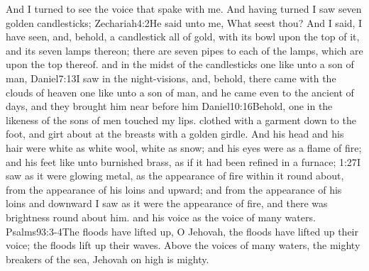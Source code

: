 And I turned to see the voice that spake with me. And having turned I saw seven golden candlesticks;%
	{Zechariah}{4:2}{He said unto me, What seest thou? And I said, I have seen, and, behold, a candlestick all of gold, with its bowl upon the top of it, and its seven lamps thereon; there are seven pipes to each of the lamps, which are upon the top thereof.} %
and in the midst of the candlesticks one like unto a son of man,%
%
			{Daniel}{7:13}{I saw in the night-visions, and, behold, there came with the clouds of heaven one like unto a son of man, and he came even to the ancient of days, and they brought him near before him}%
			{Daniel}{10:16}{Behold, one in the likeness of the sons of men touched my lips.} %
clothed with a garment down to the foot, and girt about at the breasts with a golden girdle.%
And his head and his hair were white as white wool, white as snow;%
and his eyes were as a flame of fire;%
and his feet like unto burnished brass, as if it had been refined in a furnace;%
			{1:27}{I saw as it were glowing metal, as the appearance of fire within it round about, from the appearance of his loins and upward; and from the appearance of his loins and downward I saw as it were the appearance of fire, and there was brightness round about him.} %
and his voice as the voice of many waters.%
	{Psalms}{93:3-4}{The floods have lifted up, O Jehovah, the floods have lifted up their voice; the floods lift up their waves. Above the voices of many waters, the mighty breakers of the sea, Jehovah on high is mighty.} %
